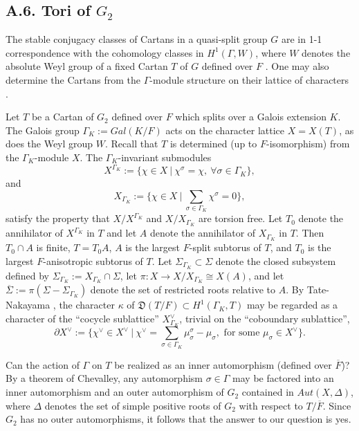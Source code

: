 \documentclass[12pt,letterpaper]{amsart}
\begin{document}
\subsection*{A.6. Tori of $G_2$}

The stable conjugacy classes of Cartans in a quasi-split group $G$
are in 1-1 correspondence with the cohomology classes in
$H^1(\Gamma, W)$, where $W$ denotes the absolute Weyl group of
a fixed Cartan $T$ of $G$ defined over $F$ \cite[\S 4, Lemma 3]{Ro80}.
One may also determine the Cartans from the $\Gamma$-module
structure on their lattice of characters \cite{Sa71}.

Let $T$ be a Cartan of $G_2$ defined over $F$ which splits over a Galois
extension $K$. The Galois
group $\Gamma_K:=Gal(K/F)$ acts on the character lattice
$X=X(T)$, as does the Weyl group $W$. Recall
that $T$ is determined (up to $F$-isomorphism)
from the $\Gamma_K$-module $X$. The $\Gamma_K$-invariant submodules
\[
X^{\Gamma_K}:=\{\chi\in X\ |\ \chi^\sigma =\chi,\ \forall\sigma\in\Gamma_K\},
\]
and
\[
X_{\Gamma_K}:=\{\chi\in X\ |\ \sum_{\sigma\in\Gamma_K}\chi^\sigma =0\},
\]
satisfy the property that $X/X^{\Gamma_K}$ and $X/X_{\Gamma_K}$ are
torsion free. Let $T_0$ denote the annihilator of
$X^{\Gamma_K}$ in $T$ and let $A$ denote the annihilator of
$X_{\Gamma_K}$ in $T$.
Then $T_0\cap A$ is finite, $T=T_0A$, $A$ is the largest $F$-split
subtorus of $T$, and $T_0$ is the largest $F$-anisotropic subtorus of $T$.
Let $\Sigma_{\Gamma_K}\subset \Sigma$ denote the closed
subsystem defined by $\Sigma_{\Gamma_K}:=X_{\Gamma_K}\cap \Sigma$, let
$\pi:X\rightarrow X/X_{\Gamma_K} \cong X(A)$, and let $\overline{\Sigma}:=
\pi( \Sigma-\Sigma_{\Gamma_K})$ denote the set of restricted roots
relative to $A$. By Tate-Nakayama \cite[p. 702]{La79},
the character $\kappa$ of ${\mathfrak D}(T/F)\subset H^1(\Gamma_K,T)$
may be regarded as a character of the ``cocycle sublattice''
$X_{\Gamma_K}^{\vee}$, trivial on the ``coboundary sublattice'',
\[
\partial X^{\vee}:=\{\chi^{\vee}\in X^{\vee}\ |\
\chi^{\vee}=\sum_{\sigma\in\Gamma_K}\mu_\sigma^\sigma-\mu_\sigma,
\text{ for some }\mu_\sigma\in X^{\vee}\}.
\]

Can the action of $\Gamma$ on $T$ be realized as
an inner automorphism (defined over $\overline{F}$)? By a theorem of
Chevalley, any automorphism
$\sigma\in\Gamma$ may be factored into an inner automorphism and
an outer automorphism of $G_2$ contained in
$Aut(X,\Delta)$, where $\Delta$ denotes the set of simple positive
roots of $G_2$ with respect to $T/\overline{F}$. Since $G_2$ has no outer
automorphisms, it follows that the answer to our question is yes.
\end{document}
